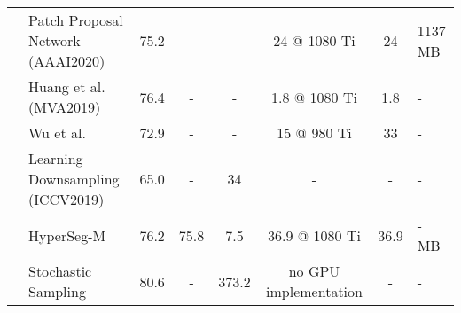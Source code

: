 \begin{table*}[tb]
\begin{tabular}{@{}clcccccZ@{}}
 & Patch Proposal Network (AAAI2020)~\cite{wu_patch_2020}                    & 75.2 &         -  &  -           & 24 @ 1080 Ti  & 24               &   1137 MB               \\
 & Huang et al. (MVA2019)~\cite{huang_uncertainty_2019}  & 76.4 &     -      & -           & 1.8 @ 1080 Ti   & 1.8                &        -           \\
 & Wu et al.~\cite{wu_real-time_2017}    & 72.9 &      -     & -           & 15 @ 980 Ti   & 33    & -                  \\ 
 & Learning Downsampling (ICCV2019)~\cite{marin_efficient_2019}    & 65.0 &   -        &  34           & -   &-    & -                  \\ 
 & HyperSeg-M~\cite{nirkin2021hyperseg} & 76.2 & 75.8 & 7.5 & 36.9 @ 1080 Ti & 36.9 & - MB \\
 & Stochastic Sampling~\cite{xie_spatially_2020} & 80.6 & - & 373.2 & no GPU implementation &- & - \\
\midrule


\end{tabular}
\end{table*}
